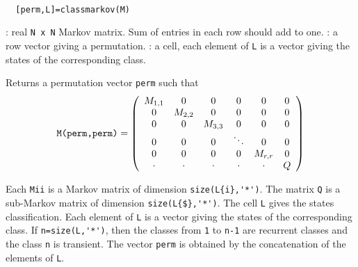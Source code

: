 \begin{mandesc}
   \\ %
\end{mandesc}
\begin{calling_sequence}
\begin{verbatim}
  [perm,L]=classmarkov(M)  
\end{verbatim}
\end{calling_sequence}
\begin{parameters}
  \begin{varlist}
    : real \verb!N x N! Markov matrix. Sum of entries in each row should add to one.
    : a row vector giving a permutation.
    : a cell, each element of \verb!L! is a vector giving the states of the corresponding class.
  \end{varlist}
\end{parameters}
\begin{mandescription}
  Returns a permutation vector \verb!perm! such that
  \begin{equation*}
    \verb!M(perm,perm)! = 
    \left( 
      \begin{array}{cccccc} 
        M_{1,1} & 0 & 0 & 0 & 0 & 0 \\ 
        0 & M_{2,2} & 0 & 0 & 0 & 0 \\ 
        0 & 0 & M_{3,3} & 0 & 0 & 0 \\ 
        0 & 0 & 0 & \ddots & 0 & 0 \\ 
        0 & 0 & 0 & 0 & M_{r,r} & 0 \\ 
        \cdot & \cdot & \cdot & \cdot & \cdot & Q 
      \end{array} 
    \right)
  \end{equation*}

  Each \verb!Mii! is a Markov matrix of dimension \verb!size(L{i},'*')!. The matrix 
  \verb!Q! is a sub-Markov matrix of dimension \verb!size(L{$},'*')!. The cell
  \verb!L! gives the states classification. Each element of \verb!L!  is a
  vector giving the states of the corresponding class. If \verb!n=size(L,'*')!,
  then the classes from \verb!1! to \verb!n-1! are recurrent classes and the
  class \verb!n! is transient. The vector \verb!perm! is obtained by the
  concatenation of the elements of \verb!L!.
\end{mandescription}
